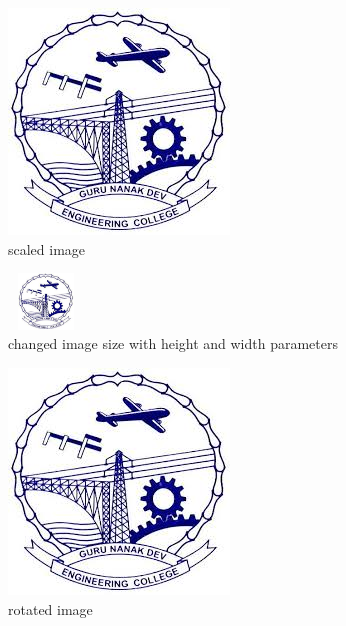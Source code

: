 \documentclass{article}
\begin{document}
		\begin{figure}
		\centering
		\includegraphics[scale=2]{../../images/gnelogo}
		\caption{scaled image}
		\label{fig:logo}
		\end{figure}
		\begin{figure}
			\centering
			\includegraphics[width=2cm, height=1.5cm]{../../images/gnelogo}
			\caption{changed image size with height and width parameters}
			\label{fig:logo}
		\end{figure}
		\begin{figure}
			\centering
			\includegraphics[scale=1.2,angle=45]{../../images/gnelogo}
			\caption{rotated image}
			\label{fig:logo}
			
		\end{figure}
		
	
\end{document}
